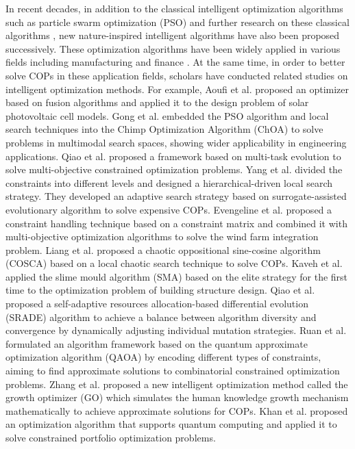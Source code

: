 \documentclass[preprint,review,compress,12pt]{elsarticle}
\begin{document}
In recent decades, in addition to the classical intelligent optimization algorithms such as particle swarm optimization (PSO) \cite{488968, dorigo2006ant, yang2009cuckoo} and further research on these classical algorithms \cite{comert2023new, wu2023modified, li2022improved, zaman2022improved}, new nature-inspired intelligent algorithms \cite{mohamed2020gaining, al2020new, dehghani2023coati, naruei2022wild, oyelade2022ebola} have also been proposed successively. These optimization algorithms have been widely applied in various fields including manufacturing and finance \cite{fountas2021multi, sabzi2018fast, singh2019new}. At the same time, in order to better solve COPs in these application fields, scholars have conducted related studies on intelligent optimization methods. For example, Aoufi et al. \cite{aoufi2023nlbbode} proposed an optimizer based on fusion algorithms and applied it to the design problem of solar photovoltaic cell models. Gong et al. \cite{gong2022niching} embedded the PSO algorithm and local search techniques into the Chimp Optimization Algorithm (ChOA) to solve problems in multimodal search spaces, showing wider applicability in engineering applications. Qiao et al. \cite{9690609} proposed a framework based on multi-task evolution to solve multi-objective constrained optimization problems. Yang et al. \cite{yang2023general} divided the constraints into different levels and designed a hierarchical-driven local search strategy. They developed an adaptive search strategy based on surrogate-assisted evolutionary algorithm to solve expensive COPs. Evengeline et al. \cite{evangeline2022wind} proposed a constraint handling technique based on a constraint matrix and combined it with multi-objective optimization algorithms to solve the wind farm integration problem. Liang et al. \cite{liang2022chaotic} proposed a chaotic oppositional sine-cosine algorithm (COSCA) based on a local chaotic search technique to solve COPs. Kaveh et al. \cite{kaveh2022improved} applied the slime mould algorithm (SMA) based on the elite strategy for the first time to the optimization problem of building structure design. Qiao et al. \cite{qiao2022self} proposed a self-adaptive resources allocation-based differential evolution (SRADE) algorithm to achieve a balance between algorithm diversity and convergence by dynamically adjusting individual mutation strategies. Ruan et al. \cite{ruan2023quantum} formulated an algorithm framework based on the quantum approximate optimization algorithm (QAOA) by encoding different types of constraints, aiming to find approximate solutions to combinatorial constrained optimization problems. Zhang et al. \cite{zhang2023growth} proposed a new intelligent optimization method called the growth optimizer (GO) which simulates the human knowledge growth mechanism mathematically to achieve approximate solutions for COPs. Khan et al. \cite{khan2021quantum} proposed an optimization algorithm that supports quantum computing and applied it to solve constrained portfolio optimization problems.
\end{document}
